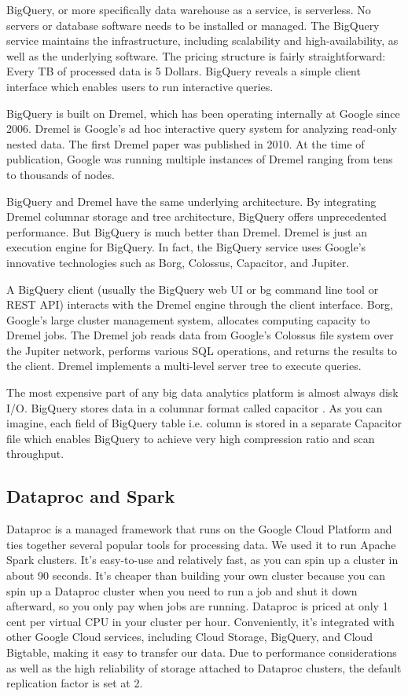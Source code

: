 \documentclass[a4paper,12pt]{article}
\begin{document}
BigQuery, or more specifically data warehouse as a service, is serverless. No servers or database software needs to be
installed or managed. The BigQuery service maintains the infrastructure, including scalability and high-availability,
as well as the underlying software. The pricing structure is fairly straightforward: Every TB of processed data is 5
Dollars. BigQuery reveals a simple client interface which enables users to run interactive queries.


BigQuery is built on  Dremel\cite{Dremel}, which has been operating internally at Google since 2006. Dremel is Google's
ad hoc interactive  query system for analyzing read-only nested data. The first Dremel paper was published in 2010.
At the time of publication, Google was running multiple instances of Dremel ranging from tens to thousands of nodes.

BigQuery and Dremel have the same underlying architecture. By integrating Dremel columnar storage and tree architecture,
BigQuery offers unprecedented performance. But BigQuery is much better than Dremel. Dremel is just an execution engine for BigQuery. In fact, the BigQuery service uses Google's innovative technologies such as Borg\cite{Borg}, Colossus, Capacitor, and Jupiter.

A BigQuery client (usually the BigQuery web UI or bg command line tool or REST API) interacts with the Dremel engine
through the client interface. Borg, Google's large cluster management system, allocates computing capacity to Dremel
jobs. The Dremel job reads data from Google's Colossus file system over the Jupiter network, performs various SQL
operations, and returns the results to the client. Dremel implements a multi-level server tree to execute queries.

The most expensive part of any big data analytics platform is almost always disk I/O. BigQuery stores data in a columnar
format called capacitor\cite{StoringDremel} . As you can imagine, each field of BigQuery table i.e. column is stored in
a separate Capacitor file which enables BigQuery to achieve very high compression ratio and scan throughput.

\subsection{Dataproc and Spark}
\label{sec:spark}

Dataproc is a managed framework that runs on the Google Cloud Platform and ties together several popular tools for processing data.
We used it to run Apache Spark clusters. It's easy-to-use and relatively fast, as you can spin up a cluster in about 90 seconds.
It’s cheaper than building your own cluster because you can spin up a Dataproc cluster when you need to run a job and
shut it down afterward, so you only pay when jobs are running. Dataproc is priced at only 1 cent per virtual CPU in your
cluster per hour. Conveniently, it’s integrated with other Google Cloud services, including Cloud Storage, BigQuery, and
Cloud Bigtable, making it easy to transfer our data. Due to performance considerations as well as the high reliability of
storage attached to Dataproc clusters, the default replication factor is set at 2.
\end{document}
